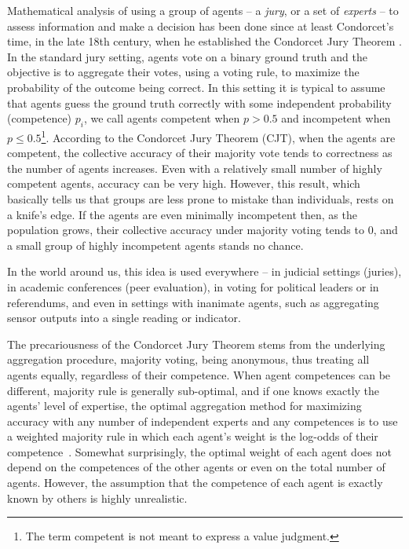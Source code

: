 \documentclass[letterpaper]{article} %
\begin{document}
Mathematical analysis of using a group of agents -- a \emph{jury}, or a set of \emph{experts} -- to assess information and make a decision has been done since at least Condorcet's time, in the late 18th century, when he established the Condorcet Jury Theorem \cite{de1785essai,sep-jury-theorems}. In the standard jury setting, agents vote on a binary ground truth and the objective is to aggregate their votes, using a voting rule, to maximize the probability of the outcome being correct. In this setting it is typical to assume that agents guess the ground truth correctly with some independent probability (competence) $p_i$, we call agents competent when $p > 0.5$ and incompetent when $p \leq 0.5$\footnote{The term competent is not meant to express a value judgment.}.
According to the Condorcet Jury Theorem (CJT), when the agents are competent, the collective accuracy of their majority vote tends to correctness as the number of agents increases. Even with a relatively small number of highly competent agents, accuracy can be very high. However, this result, which basically tells us that groups are less prone to mistake than individuals, rests on a knife's edge. If the agents are even minimally incompetent then, as the population grows, their collective accuracy under majority voting tends to 0, and a small group of highly incompetent agents stands no chance.

In the world around us, this idea is used everywhere -- in judicial settings (juries), in academic conferences (peer evaluation), in voting for political leaders or in referendums, and even in settings with inanimate agents, such as aggregating sensor outputs into a single reading or indicator.

The precariousness of the Condorcet Jury Theorem stems from the underlying aggregation procedure, majority voting, being anonymous, thus treating all agents equally, regardless of their competence. When agent competences can be different, majority rule is generally sub-optimal, and if one knows exactly the agents' level of expertise, the optimal aggregation method for maximizing accuracy with any number of independent experts and any competences is to use a weighted majority rule in which each agent's weight is the log-odds of their competence~\cite{shapley1984optimizing,nitzan1982optimal}. Somewhat surprisingly, the optimal weight of each agent does not depend on the competences of the other agents or even on the total number of agents. However, the assumption that the competence of each agent is exactly known by others is highly unrealistic.
\end{document}
